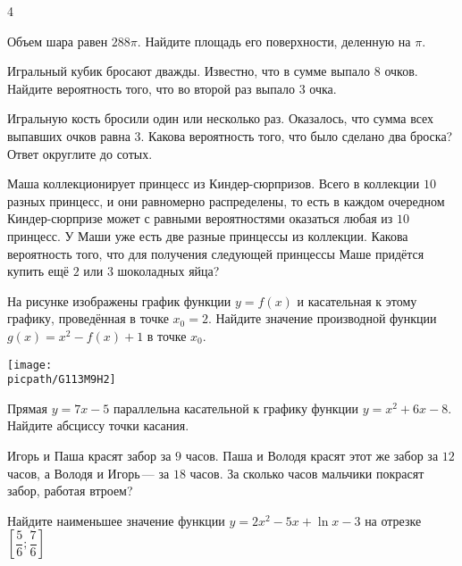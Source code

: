 \begin{class}[number=4]
	\begin{listofex}
		\item 4
		
	\end{listofex}
\end{class}

\begin{homework}[number=2]
	\begin{listofex}
		\item Объем шара равен \( 288\pi \). Найдите площадь его поверхности, деленную на \( \pi \).
		\item Игральный кубик бросают дважды. Известно, что в сумме выпало \( 8 \) очков. Найдите вероятность того, что во второй раз выпало \( 3 \) очка.
		\item Игральную кость бросили один или несколько раз. Оказалось, что сумма всех выпавших очков равна \( 3 \). Какова вероятность того, что было сделано два броска? Ответ округлите до сотых.
		\item Маша коллекционирует принцесс из Киндер-сюрпризов. Всего в коллекции \( 10 \) разных принцесс, и они равномерно распределены, то есть в каждом очередном Киндер-сюрпризе может с равными вероятностями оказаться любая из \( 10 \) принцесс. У Маши уже есть две разные принцессы из коллекции. Какова вероятность того, что для получения следующей принцессы Маше придётся купить ещё \( 2 \) или \( 3 \) шоколадных яйца?
		\item 
		\begin{minipage}[t]{\bodywidth}
			На рисунке изображены график функции \( y=f(x) \) и касательная к этому графику, проведённая в точке \( x_0=2 \). Найдите значение производной функции \( g(x)=x^2-f(x)+1 \) в точке \( x_0 \).
		\end{minipage}
		\gapwidth
		\begin{minipage}[t]{\picwidth}
			\texttt{[image: \\picpath/G113M9H2]}
		\end{minipage}
		\item Прямая \( y=7x-5 \) параллельна касательной к графику функции \( y=x^2+6x-8 \). Найдите абсциссу точки касания.
		\item Игорь и Паша красят забор за \( 9 \) часов. Паша и Володя красят этот же забор за \( 12 \) часов, а Володя и Игорь --- за \( 18 \) часов. За сколько часов мальчики покрасят забор, работая втроем?
		\item Найдите наименьшее значение функции \( y=2x^2-5x+\ln x-3 \) на отрезке \( \left[ \dfrac{5}{6}; \dfrac{7}{6} \right] \)

\end{listofex}
\end{homework}
